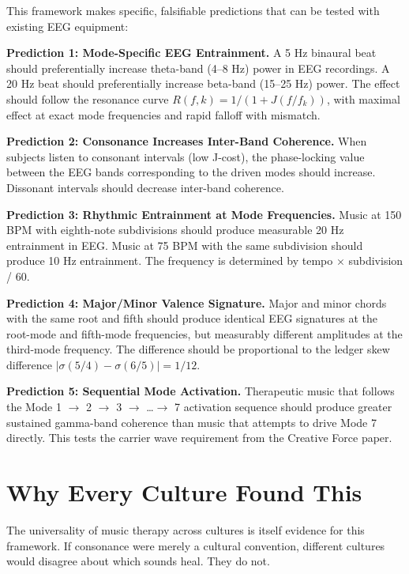 \documentclass[11pt,a4paper]{article}
\begin{document}
This framework makes specific, falsifiable predictions that can be tested with existing EEG equipment:

\textbf{Prediction 1: Mode-Specific EEG Entrainment.}
A 5 Hz binaural beat should preferentially increase theta-band (4--8 Hz) power in EEG recordings. A 20 Hz beat should preferentially increase beta-band (15--25 Hz) power. The effect should follow the resonance curve $R(f, k) = 1/(1 + J(f/f_k))$, with maximal effect at exact mode frequencies and rapid falloff with mismatch.

\textbf{Prediction 2: Consonance Increases Inter-Band Coherence.}
When subjects listen to consonant intervals (low J-cost), the phase-locking value between the EEG bands corresponding to the driven modes should increase. Dissonant intervals should decrease inter-band coherence.

\textbf{Prediction 3: Rhythmic Entrainment at Mode Frequencies.}
Music at 150 BPM with eighth-note subdivisions should produce measurable 20 Hz entrainment in EEG. Music at 75 BPM with the same subdivision should produce 10 Hz entrainment. The frequency is determined by tempo $\times$ subdivision / 60.

\textbf{Prediction 4: Major/Minor Valence Signature.}
Major and minor chords with the same root and fifth should produce identical EEG signatures at the root-mode and fifth-mode frequencies, but measurably different amplitudes at the third-mode frequency. The difference should be proportional to the ledger skew difference $|\sigma(5/4) - \sigma(6/5)| = 1/12$.

\textbf{Prediction 5: Sequential Mode Activation.}
Therapeutic music that follows the Mode 1 $\to$ 2 $\to$ 3 $\to$ \ldots $\to$ 7 activation sequence should produce greater sustained gamma-band coherence than music that attempts to drive Mode 7 directly. This tests the carrier wave requirement from the Creative Force paper.

\section{Why Every Culture Found This}

The universality of music therapy across cultures is itself evidence for this framework. If consonance were merely a cultural convention, different cultures would disagree about which sounds heal. They do not.
\end{document}

